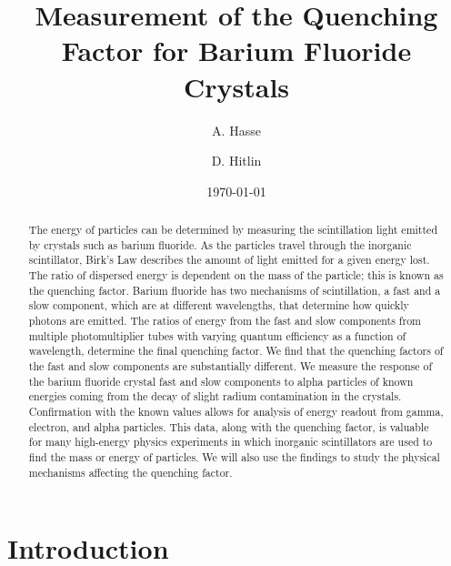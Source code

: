 \documentclass[aip, jmp, amssymb, amsmath, reprint, floatfix]{revtex4-1}
\begin{document}
\title[Measurement of the Quenching Factor for Barium Fluoride Crystals]{Measurement of the Quenching Factor for Barium Fluoride Crystals}

\author{A. Hasse}

\author{D. Hitlin}


\date{\today}

\begin{abstract}
The energy of particles can be determined by measuring the scintillation light emitted by crystals such as barium fluoride. As the particles travel through the inorganic scintillator, Birk’s Law describes the amount of light emitted for a given energy lost. The ratio of dispersed energy is dependent on the mass of the particle; this is known as the quenching factor. Barium fluoride has two mechanisms of scintillation, a fast and a slow component, which are at different wavelengths, that determine how quickly photons are emitted. The ratios of energy from the fast and slow components from multiple photomultiplier tubes with varying quantum efficiency as a function of wavelength, determine the final quenching factor. We find that the quenching factors of the fast and slow components are substantially different.
We measure the response of the barium fluoride crystal fast and slow components to alpha particles of known energies coming from the decay of slight radium contamination in the crystals. Confirmation with the known values allows for analysis of energy readout from gamma, electron, and alpha particles. This data, along with the quenching factor, is valuable for many high-energy physics experiments in which inorganic scintillators are used to find the mass or energy of particles. We will also use the findings to study the physical mechanisms affecting the quenching factor.
\end{abstract}

\maketitle

\section{\label{sec:level1}Introduction}
\end{document}
